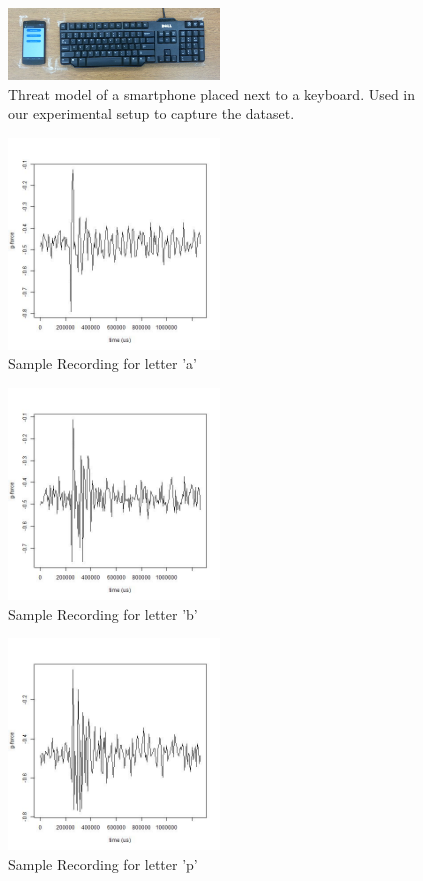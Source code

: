 \documentclass[11pt,conference]{IEEEtran}
\begin{document}
\begin{figure}
\centering
\includegraphics[width=0.5\textwidth]{img/setup}
\caption{Threat model of a smartphone placed next to a keyboard. Used in our experimental setup to capture the dataset.
}
\label{fig:setup}
\end{figure}

\begin{figure}
\centering
\includegraphics[width=0.5\textwidth]{img/a_162}
\caption{Sample Recording for letter 'a'}
\label{fig:signal-a}
\end{figure}

\begin{figure}
\centering
\includegraphics[width=0.5\textwidth]{img/b_147}
\caption{Sample Recording for letter 'b'}
\label{fig:signal-b}
\end{figure}

\begin{figure}
\centering
\includegraphics[width=0.5\textwidth]{img/p_566}
\caption{Sample Recording for letter 'p'}
\label{fig:signal-p}
\end{figure}
\end{document}
